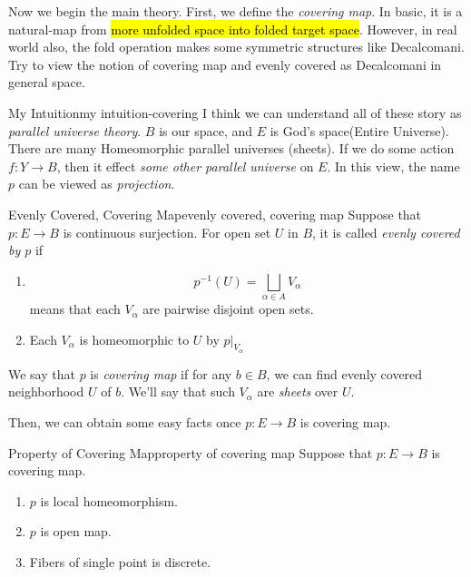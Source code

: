 \documentclass[12pt, a4paper, twoside]{article}
\theoremstyle{plain}
\begin{document}
Now we begin the main theory. First, we define the \textit{covering map}. 
In basic, it is a natural-map from \hl{more unfolded space into folded target space}. 
However, in real world also, the fold operation makes some symmetric structures like Decalcomani. 
Try to view the notion of covering map and evenly covered as Decalcomani in general space. 

\begin{rem}{My Intuition}{my intuition-covering}
    I think we can understand all of these story as \textit{parallel universe theory}. 
    $B$ is our space, and $E$ is God's space(Entire Universe). There are many Homeomorphic parallel universes (sheets). 
    If we do some action $f: Y \rightarrow B$, then it effect \textit{some other parallel universe} on $E$. 
    In this view, the name $p$ can be viewed as \textit{projection}. 
\end{rem}

\begin{defn}{Evenly Covered, Covering Map}{evenly covered, covering map}
    Suppose that $p: E \rightarrow B$ is continuous surjection. 
    For open set $U$ in $B$, it is called \textit{evenly covered by $p$}
    if 
    \begin{enumerate}
        \item[(1)] \[p^{-1}(U) = \bigsqcup_{\alpha \in A} V_\alpha\]
    means that each $V_\alpha$ are pairwise disjoint open sets. 
        \item[(2)] Each $V_\alpha$ is homeomorphic to $U$ by $p|_{V_\alpha}$ 
    \end{enumerate}
    We say that $p$ is \textit{covering map} if for any $b \in B$, we can find evenly covered neighborhood $U$ of $b$. 
    We'll say that such $V_\alpha$ are \textit{sheets} over $U$. 
\end{defn}

Then, we can obtain some easy facts once $p: E \rightarrow B$ is covering map. 

\begin{prop}{Property of Covering Map}{property of covering map}
    Suppose that $p: E \rightarrow B$ is covering map. 
    \begin{enumerate}
        \item[(1)] $p$ is local homeomorphism. 
        \item[(2)] $p$ is open map. 
        \item[(3)] Fibers of single point is discrete. 
    \end{enumerate}
\end{prop}
\end{document}
